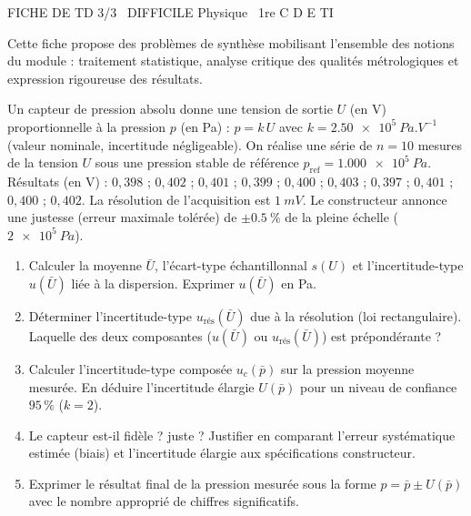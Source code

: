 \documentclass[11pt]{article}
\begin{document}
\begin{tcolorbox}[enhanced,colback=popink,colframe=popink,arc=10pt,boxrule=0pt,left=12pt,right=12pt,top=9pt,bottom=9pt]
{\color{white}\popxbold\small FICHE DE TD 3/3 \textbullet\ DIFFICILE \hfill Physique \textbullet\ 1re C D E TI\par}
\end{tcolorbox}
\vspace{4pt}
Cette fiche propose des problèmes de synthèse mobilisant l'ensemble des notions du module : traitement statistique, analyse critique des qualités métrologiques et expression rigoureuse des résultats.

\begin{exercice}
Un capteur de pression absolu donne une tension de sortie $U$ (en V) proportionnelle à la pression $p$ (en Pa) : $p = k\,U$ avec $k = \SI{2,50e5}{Pa.V^{-1}}$ (valeur nominale, incertitude négligeable). On réalise une série de $n=10$ mesures de la tension $U$ sous une pression stable de référence $p_{\text{ref}} = \SI{1,000e5}{Pa}$. Résultats (en V) : 
$0,398$ ; $0,402$ ; $0,401$ ; $0,399$ ; $0,400$ ; $0,403$ ; $0,397$ ; $0,401$ ; $0,400$ ; $0,402$.
La résolution de l'acquisition est $\SI{1}{mV}$. Le constructeur annonce une justesse (erreur maximale tolérée) de $\pm \SI{0,5}{\%}$ de la pleine échelle ($\SI{2e5}{Pa}$).
\begin{enumerate}
    \item Calculer la moyenne $\bar{U}$, l'écart-type échantillonnal $s(U)$ et l'incertitude-type $u(\bar{U})$ liée à la dispersion. Exprimer $u(\bar{U})$ en Pa.
    \item Déterminer l'incertitude-type $u_{\text{rés}}(\bar{U})$ due à la résolution (loi rectangulaire). Laquelle des deux composantes ($u(\bar{U})$ ou $u_{\text{rés}}(\bar{U})$) est prépondérante ?
    \item Calculer l'incertitude-type composée $u_c(\bar{p})$ sur la pression moyenne mesurée. En déduire l'incertitude élargie $U(\bar{p})$ pour un niveau de confiance $95\,\%$ ($k=2$).
    \item Le capteur est-il \og fidèle \fg ? \og juste \fg ? Justifier en comparant l'erreur systématique estimée (biais) et l'incertitude élargie aux spécifications constructeur.
    \item Exprimer le résultat final de la pression mesurée sous la forme $p = \bar{p} \pm U(\bar{p})$ avec le nombre approprié de chiffres significatifs.
\end{enumerate}
\end{exercice}
\end{document}

